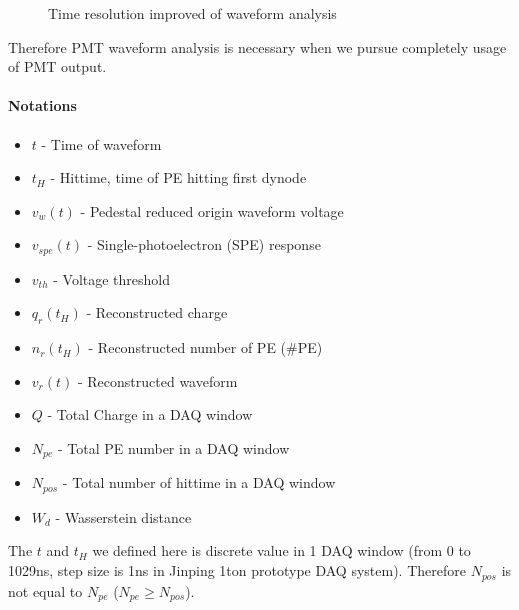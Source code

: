 \begin{figure}[H]
    \centering
    \scalebox{0.35}{}
    \caption{\label{fig:reso-diff} Time resolution improved of waveform analysis}
\end{figure}

Therefore PMT waveform analysis is necessary when we pursue completely usage of PMT output. 

\paragraph{Notations}
\begin{itemize}
    \item $t$ - Time of waveform
    \item $t_{H}$ - Hittime, time of PE hitting first dynode
    \item $v_{w}(t)$ - Pedestal reduced origin waveform voltage
    \item $v_{spe}(t)$ - Single-photoelectron (SPE) response
    \item $v_{th}$ - Voltage threshold
    \item $q_{r}(t_{H})$ - Reconstructed charge
    \item $n_{r}(t_{H})$ - Reconstructed number of PE (\#PE)
    \item $v_{r}(t)$ - Reconstructed waveform
    \item $Q$ - Total Charge in a DAQ window
    \item $N_{pe}$ - Total PE number in a DAQ window
    \item $N_{pos}$ - Total number of hittime in a DAQ window
    \item $W_{d}$ - Wasserstein distance
\end{itemize}
The $t$ and $t_{H}$ we defined here is discrete value in 1 DAQ window (from 0 to 1029ns, step size is 1ns in Jinping 1ton prototype DAQ system). Therefore $N_{pos}$ is not equal to $N_{pe}$ ($N_{pe} \geq N_{pos}$). 
